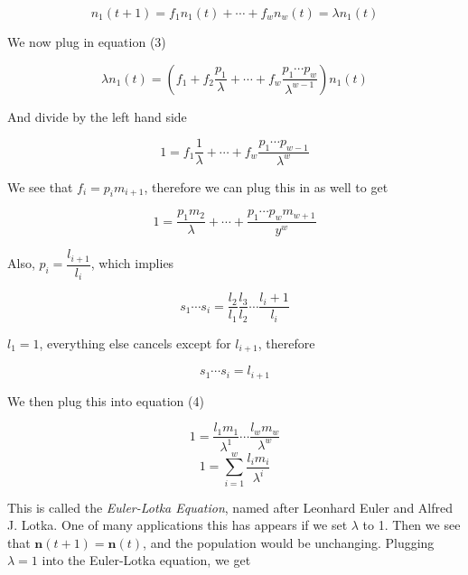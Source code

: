\documentclass{article}
\begin{document}
\begin{equation*}
n_1(t+1)=f_1n_1(t)+ \cdots + f_wn_w(t) = \lambda n_1(t)
\end{equation*}

We now plug in equation (3)

\begin{equation*}
\lambda n_1(t) = (f_1 + f_2 \frac{p_1}{\lambda} + \cdots + f_w \frac{p_1 \cdots p_w}{\lambda ^{w-1}}) n_1(t)
\end{equation*}

And divide by the left hand side

\begin{equation*}
1 = f_1 \frac{1}{\lambda} + \cdots + f_w \frac{p_1 \cdots p_{w-1}}{\lambda ^{w
}}
\end{equation*}

We see that $ f_i = p_im_{i+1}$, therefore we can plug this in as well to get

\begin{equation}
1 = \frac{p_1m_2}{\lambda} + \cdots + \frac{p_1 \cdots p_{w}m_{w+1}}{y^w}
\end{equation} 

Also, $ p_i= \dfrac{l_{i+1}}{l_i} $, which implies

\begin{equation*}
s_1 \cdots s_i = \frac{l_2}{l_1} \frac{l_3}{l_2} \cdots \frac{l_i+1}{l_i}
\end{equation*}

$ l_1 = 1$, everything else cancels except for $ l_{i+1} $, therefore

\begin{equation*}
s_1 \cdots s_i = l_{i+1}
\end{equation*}

We then plug this into equation (4)

\begin{equation*}
1 = \frac{l_1m_1}{\lambda ^ 1} \cdots \frac{l_wm_w}{\lambda ^ w}
\end{equation*}
\begin{equation*}
1 = \displaystyle\sum_{i=1}^{w}\frac{l_im_i}{\lambda ^ i}
\end{equation*}

This is called the \textit{Euler-Lotka Equation}, named after Leonhard Euler and Alfred J. Lotka. One of many applications this has appears if we set $ \lambda $ to 1. Then we see that $ \mathbf{n}(t+1) = \mathbf{n}(t) $, and the population would be unchanging. Plugging $ \lambda = 1 $ into the Euler-Lotka equation, we get
\end{document}
